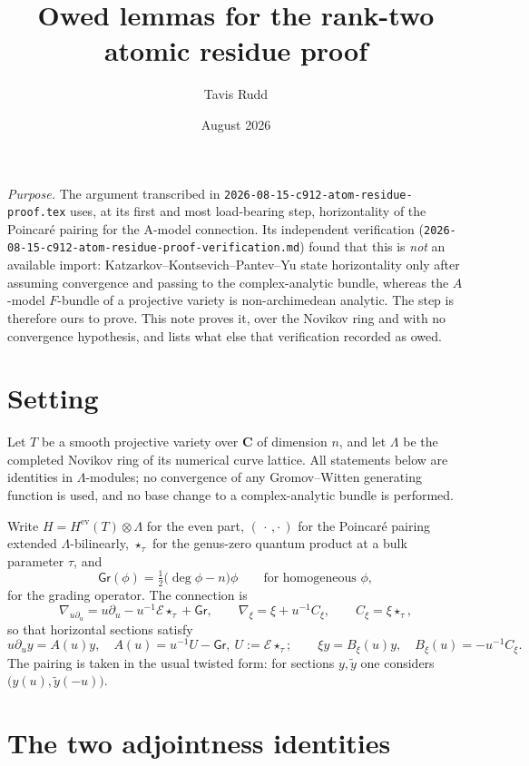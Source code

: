 \documentclass[11pt]{article}
\title{Owed lemmas for the rank-two atomic residue proof}
\author{Tavis Rudd}
\date{August 2026}
\theoremstyle{definition}
\theoremstyle{remark}
\newcommand{\C}{\mathbf C}
\newcommand{\Eu}{\mathcal E}
\newcommand{\Gr}{\mathsf{Gr}}
\newcommand{\Nov}{\Lambda}
\begin{document}
\maketitle

\noindent\emph{Purpose.} The argument transcribed in
\texttt{2026-08-15-c912-atom-residue-proof.tex} uses, at its first and most
load-bearing step, horizontality of the Poincar\'e pairing for the A-model
connection. Its independent verification
(\texttt{2026-08-15-c912-atom-residue-proof-verification.md}) found that this is
\emph{not} an available import: Katzarkov--Kontsevich--Pantev--Yu state
horizontality only after assuming convergence and passing to the
complex-analytic bundle, whereas the $A$-model $F$-bundle of a projective
variety is non-archimedean analytic. The step is therefore ours to prove. This
note proves it, over the Novikov ring and with no convergence hypothesis, and
lists what else that verification recorded as owed.

\section{Setting}

Let $T$ be a smooth projective variety over $\C$ of dimension $n$, and let
$\Nov$ be the completed Novikov ring of its numerical curve lattice. All
statements below are identities in $\Nov$-modules; no convergence of any
Gromov--Witten generating function is used, and no base change to a
complex-analytic bundle is performed.

Write $H=H^{\mathrm{ev}}(T)\otimes\Nov$ for the even part, $(\,\cdot\,,\cdot\,)$
for the Poincar\'e pairing extended $\Nov$-bilinearly, $\star_\tau$ for the
genus-zero quantum product at a bulk parameter $\tau$, and
\[
  \Gr(\phi)=\tfrac12\bigl(\deg\phi-n\bigr)\phi
  \qquad\text{for homogeneous }\phi,
\]
for the grading operator. The connection is
\[
  \nabla_{u\partial_u}=u\partial_u-u^{-1}\Eu\star_\tau+\Gr,
  \qquad
  \nabla_\xi=\xi+u^{-1}C_\xi,
  \qquad C_\xi=\xi\star_\tau,
  \tag{1}
  \label{eq:connection}
\]
so that horizontal sections satisfy
\[
  u\partial_uy=A(u)y,\quad A(u)=u^{-1}U-\Gr,\ U:=\Eu\star_\tau;
  \qquad
  \xi y=B_\xi(u)y,\quad B_\xi(u)=-u^{-1}C_\xi.
  \tag{2}
  \label{eq:matrices}
\]
The pairing is taken in the usual twisted form: for sections $y,\tilde y$ one
considers $\bigl(y(u),\tilde y(-u)\bigr)$.

\section{The two adjointness identities}
\end{document}
